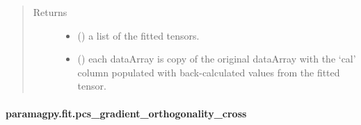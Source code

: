 \documentclass[a4paper,10pt,english,openany,oneside]{sphinxmanual}
\begin{document}
\begin{fulllineitems}
\begin{quote}
\begin{description}
\begin{itemize}
\end{itemize}

\item[{Returns}] \leavevmode
\begin{itemize}
\item {} 
 () \textendash{} a list of the fitted tensors.

\item {} 
 () \textendash{} each dataArray is copy of the original dataArray with
the ‘cal’ column populated with back-calculated values from the
fitted tensor.

\end{itemize}


\end{description}\end{quote}

\end{fulllineitems}



\paragraph{paramagpy.fit.pcs\_gradient\_orthogonality\_cross}
\label{\detokenize{reference/generated/paramagpy.fit.pcs_gradient_orthogonality_cross:paramagpy-fit-pcs-gradient-orthogonality-cross}}\label{\detokenize{reference/generated/paramagpy.fit.pcs_gradient_orthogonality_cross::doc}}
\end{document}
